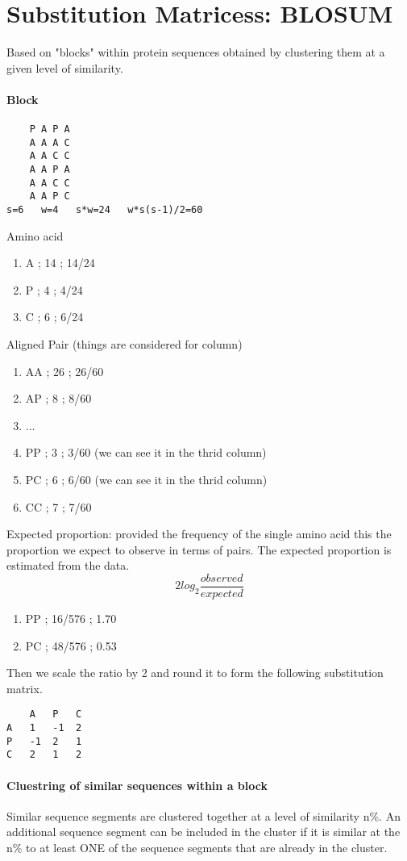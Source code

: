\documentclass[11pt]{article}
\begin{document}
\section{Substitution Matricess: BLOSUM} %
\label{sec:substitution_matricess_blosum}
Based on "blocks" within protein sequences obtained by clustering them at a given level of similarity.
\paragraph{Block} %
\label{par:block}
\begin{lstlisting}
	P A P A 
	A A A C
	A A C C 
	A A P A 
	A A C C 
	A A P C
s=6   w=4   s*w=24   w*s(s-1)/2=60
\end{lstlisting}
Amino acid
\begin{enumerate}
	\item A ; 14 ; 14/24
	\item P ; 4 ; 4/24
	\item C ; 6 ; 6/24
\end{enumerate}

Aligned Pair (things are considered for column)
\begin{enumerate}
	\item AA ; 26 ; 26/60
	\item AP ; 8 ; 8/60
	\item ...
	\item PP ; 3 ; 3/60 (we can see it in the thrid column)
	\item PC ; 6 ; 6/60 (we can see it in the thrid column)
	\item CC ; 7 ; 7/60
\end{enumerate}

Expected proportion: provided the frequency of the single amino acid this the proportion we expect to observe in terms of pairs. The expected proportion is estimated from the data.\\
$$2log_2 \frac{observed}{expected}$$
\begin{enumerate}
	\item PP ; 16/576 ; 1.70
	\item PC ; 48/576 ; 0.53
\end{enumerate}
Then we scale the ratio by 2 and round it to form the following substitution matrix.
\begin{lstlisting}
	A 	P 	C
A 	1 	-1 	2
P 	-1 	2 	1
C 	2 	1 	2
\end{lstlisting}

\paragraph{Cluestring of similar sequences within a block} %
\label{par:cluestring_of_similar_sequences_within_a_block}
Similar sequence segments are clustered together at a level of similarity n\%.
An additional sequence segment can be included in the cluster if it is similar at the n\% to at least ONE of the sequence segments that are already in the cluster.
\end{document}
